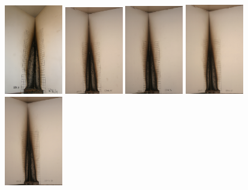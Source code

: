 \documentclass[twoside]{uocthesis}
\begin{document}
\begin{figure}[p]
	\includegraphics[width=1.0in]{../Figures/GBNG34_P5150482}
	\includegraphics[width=1.0in]{../Figures/GBNG35_IMG_9166}
	\includegraphics[width=1.0in]{../Figures/GBNG36_IMG_9181}
	\includegraphics[width=1.0in]{../Figures/GBNG37_IMG_9194}
	\includegraphics[width=1.0in]{../Figures/GBNG38_IMG_9208} \\


\end{figure}
\end{document}
